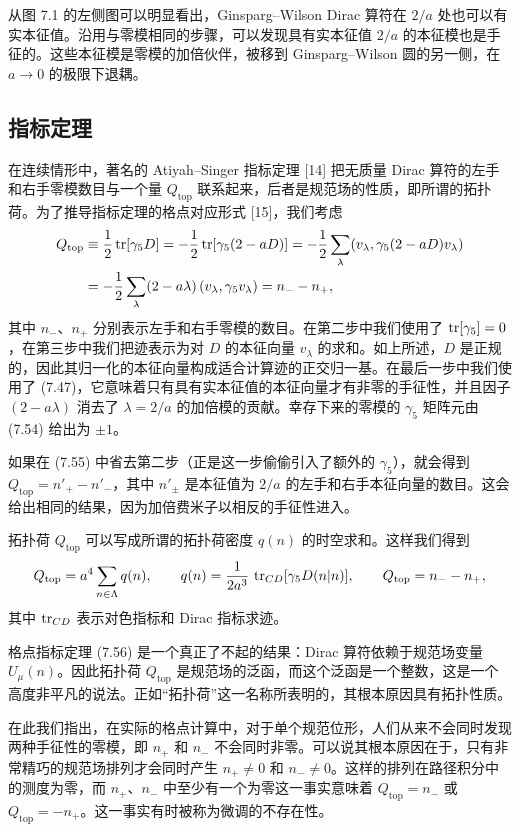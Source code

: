 从图 7.1 的左侧图可以明显看出，Ginsparg--Wilson Dirac 算符在 $2/a$ 处也可以有实本征值。沿用与零模相同的步骤，可以发现具有实本征值 $2/a$ 的本征模也是手征的。这些本征模是零模的加倍伙伴，被移到 Ginsparg--Wilson 圆的另一侧，在 $a \to 0$ 的极限下退耦。

\subsection{指标定理}

在连续情形中，著名的 Atiyah--Singer 指标定理 [14] 把无质量 Dirac 算符的左手和右手零模数目与一个量 $Q_{\mathrm{top}}$ 联系起来，后者是规范场的性质，即所谓的拓扑荷。为了推导指标定理的格点对应形式 [15]，我们考虑
\begin{align}
  Q_{\mathrm{top}} &\equiv \frac{1}{2}\operatorname{tr}[\gamma_5 D]
  = -\frac{1}{2}\operatorname{tr}[\gamma_5(2-aD)]
  = -\frac{1}{2}\sum_\lambda (v_\lambda, \gamma_5(2-aD)v_\lambda) \notag\\
  &= -\frac{1}{2}\sum_\lambda (2-a\lambda)\,(v_\lambda, \gamma_5 v_\lambda)
  = n_- - n_+,
\end{align}
其中 $n_-$、$n_+$ 分别表示左手和右手零模的数目。在第二步中我们使用了 $\operatorname{tr}[\gamma_5] = 0$，在第三步中我们把迹表示为对 $D$ 的本征向量 $v_\lambda$ 的求和。如上所述，$D$ 是正规的，因此其归一化的本征向量构成适合计算迹的正交归一基。在最后一步中我们使用了 (7.47)，它意味着只有具有实本征值的本征向量才有非零的手征性，并且因子 $(2-a\lambda)$ 消去了 $\lambda = 2/a$ 的加倍模的贡献。幸存下来的零模的 $\gamma_5$ 矩阵元由 (7.54) 给出为 $\pm 1$。

如果在 (7.55) 中省去第二步（正是这一步偷偷引入了额外的 $\gamma_5$），就会得到 $Q_{\mathrm{top}} = n'_+ - n'_-$，其中 $n'_\pm$ 是本征值为 $2/a$ 的左手和右手本征向量的数目。这会给出相同的结果，因为加倍费米子以相反的手征性进入。

拓扑荷 $Q_{\mathrm{top}}$ 可以写成所谓的拓扑荷密度 $q(n)$ 的时空求和。这样我们得到
\begin{equation}
  Q_{\mathrm{top}} = a^4\sum_{n\in\Lambda} q(n), \qquad
  q(n) = \frac{1}{2a^3}\,\operatorname{tr}_{CD}[\gamma_5 D(n|n)], \qquad
  Q_{\mathrm{top}} = n_- - n_+,
\end{equation}
其中 $\operatorname{tr}_{CD}$ 表示对色指标和 Dirac 指标求迹。

格点指标定理 (7.56) 是一个真正了不起的结果：Dirac 算符依赖于规范场变量 $U_\mu(n)$。因此拓扑荷 $Q_{\mathrm{top}}$ 是规范场的泛函，而这个泛函是一个整数，这是一个高度非平凡的说法。正如``拓扑荷''这一名称所表明的，其根本原因具有拓扑性质。

在此我们指出，在实际的格点计算中，对于单个规范位形，人们从来不会同时发现两种手征性的零模，即 $n_+$ 和 $n_-$ 不会同时非零。可以说其根本原因在于，只有非常精巧的规范场排列才会同时产生 $n_+ \neq 0$ 和 $n_- \neq 0$。这样的排列在路径积分中的测度为零，而 $n_+$、$n_-$ 中至少有一个为零这一事实意味着 $Q_{\mathrm{top}} = n_-$ 或 $Q_{\mathrm{top}} = -n_+$。这一事实有时被称为微调的不存在性。

